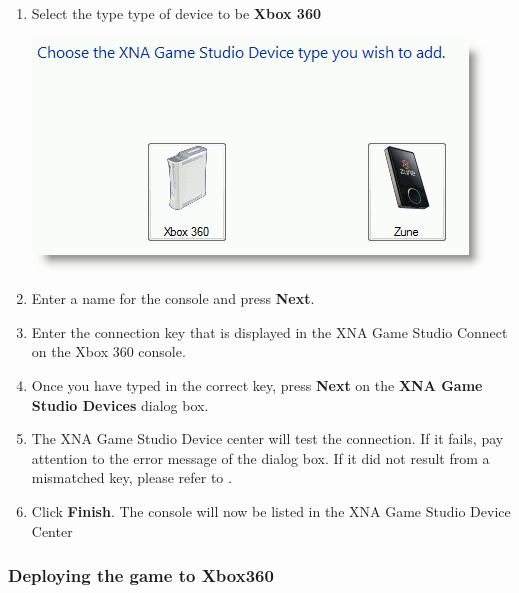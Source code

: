 \begin{enumerate}
	\item Select the type type of device to be \textbf{Xbox 360} \\ \begin{center}\includegraphics[scale=0.75]{graphics/type_of_device}\end{center} 
	\item Enter a name for the console and press \textbf{Next}. 
	\item Enter the connection key that is displayed in the XNA Game Studio Connect on the Xbox 360 console. 
	\item Once you have typed in the correct key, press \textbf{Next} on the \textbf{XNA Game Studio Devices} dialog box. 
	\item The XNA Game Studio Device center will test the connection. If it fails, pay attention to the error message of the dialog box. If it did not result from a mismatched key, please refer to \cite{troubleshoot}. 
	\item Click \textbf{Finish}. The console will now be listed in the XNA Game Studio Device Center  
\end{enumerate}

\subsubsection{Deploying the game to Xbox360}

